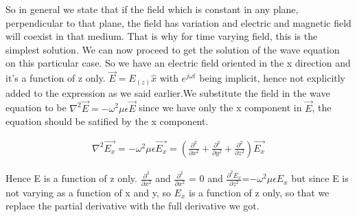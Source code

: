 So in general we state that if the field which is constant in any plane, perpendicular to that plane, the field has variation and electric and magnetic field will coexist in that medium. That is why for time varying field, this is the simplest solution. We can now proceed to get the solution of the wave equation on this particular case. So we have an electric field oriented in the x direction and it's a function of z only. $\vec{E}=E_(z)\hat{x}$ with $e^{j\omega t}$ being implicit, hence not explicitly added to the expression as we said earlier.We substitute the field in the wave equation to be $\nabla^2\vec{E}=-\omega^2\mu\epsilon\vec{E}$ since we have only the x component in $\vec{E}$, the equation should be satified by the x component.

\begin{align}
\nabla^2\vec{E_{x}}=-\omega^2\mu\epsilon\vec{E_{x}} =( {\frac{\partial^2}{\partial x^2} + \frac{\partial^2}{\partial y^2} + \frac{\partial^2}{\partial z^2}})\vec{E_{x}}
\end{align}

Hence E is a function of z only.
$\frac{\partial^2}{\partial x^2}$ and $\frac{\partial^2}{\partial x^2}$ = 0 and $\frac{\partial^2  E_x}{\partial z^2}$=$-\omega^2\mu\epsilon E_{x}$ but since E is not varying as a function of x and y, so $E_x$ is a function of z only, so that we replace the partial derivative with the full derivative we got.

